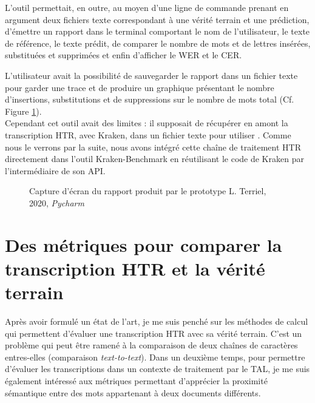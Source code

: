 L'outil  permettait, en outre, au moyen d'une ligne de commande prenant en argument deux fichiers texte correspondant à une vérité terrain et une prédiction, d'émettre un rapport dans le terminal comportant le nom de l'utilisateur, le texte de référence, le texte prédit, de comparer le nombre de mots et de lettres insérées, substituées et supprimées et enfin d'afficher le WER et le CER.

L'utilisateur avait la possibilité de sauvegarder le rapport dans un fichier texte pour garder une trace et de produire un graphique présentant le nombre d'insertions, substitutions et de suppressions sur le nombre de mots total (Cf. Figure \ref{fig:cerwer}).\\
\newpage
Cependant cet outil avait des limites : il supposait de récupérer en amont la transcription HTR, avec Kraken, dans un fichier texte pour utiliser . Comme nous le verrons par la suite, nous avons intégré cette chaîne de traitement HTR directement dans l'outil Kraken-Benchmark en réutilisant le code de Kraken par l'intermédiaire de son API.

\begin{figure}[h]
    \centering
    \centerline{}
    \caption{Capture d'écran du rapport produit par le prototype  \textcopyright L. Terriel, 2020, \textit{Pycharm}}
    \label{fig:cerwer}
\end{figure}
\newpage
\section{Des métriques pour comparer la transcription HTR et la vérité terrain}\label{metriques}

Après avoir formulé un état de l'art, je me suis penché sur les méthodes de calcul qui permettent d'évaluer une transcription HTR avec sa vérité terrain. C'est un problème qui peut être ramené à la comparaison de deux chaînes de caractères entres-elles (comparaison \textit{text-to-text}). Dans un deuxième temps, pour permettre d'évaluer les transcriptions dans un contexte de traitement par le TAL, je me suis également intéressé aux métriques permettant d'apprécier la proximité sémantique entre des mots appartenant à deux documents différents.\\

